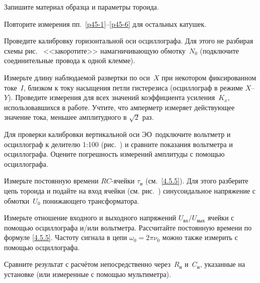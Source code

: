 \begin{lab:task}
\item \label{p45-6} Запишите материал образца и параметры тороида.

\item Повторите измерения пп.~\ref{p45-1}--\ref{p45-6} 
для остальных катушек.


\item \label{p45-8}
Проведите калибровку горизонтальной оси осциллографа. 
Для этого не разбирая схемы рис.~ 
<<закоротите>> намагничивающую обмотку~$N_0$ 
(подключите соединительные провода к одной клемме). 

Измерьте длину наблюдаемой развертки по оси~$X$ при некотором фиксированном 
токе~$I$, близком к току насыщения петли гистерезиса 
(осциллограф в режиме $X$--$Y$). 
Проведите измерения для всех значений коэффициента усиления~$K_x$, 
использовавшихся в работе. 
Учтите, что амперметр измеряет действующее значение тока, 
меньшее амплитудного в  $\sqrt{2}$ раз.

\item
Для проверки калибровки вертикальной оси ЭО~подключите вольтметр и осциллограф 
к делителю 1:100 (рис.~) и сравните показания
вольтметра и осциллографа. Оцените погрешность измерений амплитуды
с помощью осциллографа.


\item
Измерьте постоянную времени $RC$-ячейки $\tau_{и}$ (см.~\eqref{4.5.5}). 
Для этого разберите цепь тороида и подайте на вход ячейки
(см. рис.~) синусоидальное напряжение 
с обмотки~$U_0$ понижающего трансформатора.

\item Измерьте отношение входного и выходного напряжений 
$U_\text{вх} / U_\text{вых}$ ячейки с помощью осциллографа и/или вольтметра.
Рассчитайте постоянную времени по формуле \eqref{4.5.5}.
Частоту сигнала в цепи $\omega_0=2\pi\nu_0$ 
можно также измерить с помощью осциллографа.


\item Сравните результат с расчётом непосредственно 
через~$R_\text{и}$ и~$C_\text{и}$, указанные на установке
(или измеренные с помощью мультиметра).





\end{lab:task}
